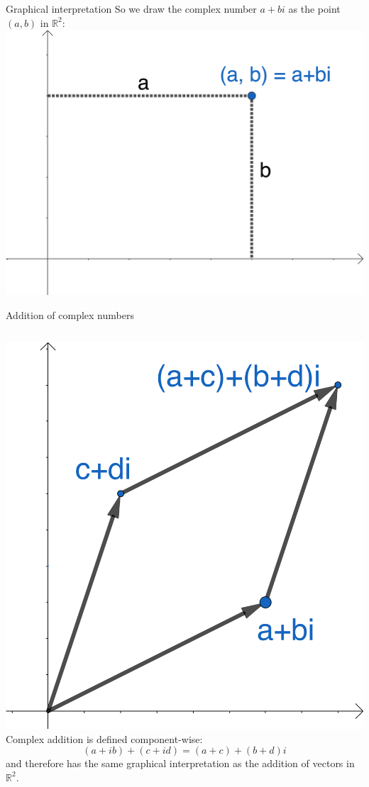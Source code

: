 \documentclass{beamer}
\begin{document}
\begin{frame}[fragile]{Graphical interpretation}
So we draw the complex number $a+bi$ as the point $(a, b)$ in $\mathbb{R}^2$:
\includegraphics{complex-plane.png}
\end{frame}

\begin{frame}{Addition of complex numbers}
\begin{columns}
\includegraphics[scale=0.5]{complex-addition.png}
Complex addition is defined component-wise:
\begin{equation*}
(a+ib)+(c+id) = (a+c)+(b+d)i
\end{equation*}
and therefore has the same graphical interpretation as the addition of vectors in $\mathbb{R}^2$.
\end{columns}
\end{frame}
\end{document}
